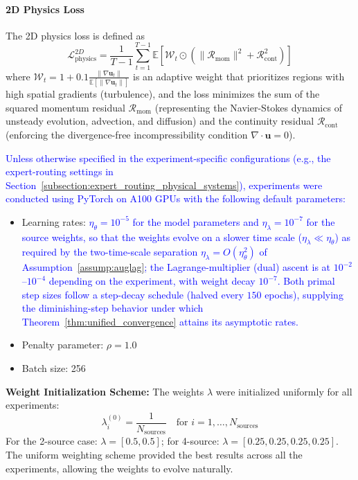 \documentclass[preprint,12pt,authoryear]{elsarticle}
\begin{document}
\paragraph{2D Physics Loss}

\noindent The 2D physics loss is defined as
\[
\mathcal{L}_{\text{physics}}^{2D} = \frac{1}{T-1}\sum_{t=1}^{T-1} \mathbb{E}\left[ \mathcal{W}_t \odot \left( \|\mathcal{R}_{\text{mom}}\|^2 + \mathcal{R}_{\text{cont}}^2 \right) \right]
\]
where $\mathcal{W}_t = 1 + 0.1 \frac{\| \nabla \mathbf{u}_t \|}{\mathbb{E}[\| \nabla \mathbf{u}_t \|]}$ is an adaptive weight that prioritizes regions with high spatial gradients (turbulence), and the loss minimizes the sum of the squared momentum residual $\mathcal{R}_{\text{mom}}$ (representing the Navier-Stokes dynamics of unsteady evolution, advection, and diffusion) and the continuity residual $\mathcal{R}_{\text{cont}}$ (enforcing the divergence-free incompressibility condition $\nabla \cdot \mathbf{u} = 0$).


\textcolor{blue}{Unless otherwise specified in the experiment-specific configurations (e.g., the expert-routing settings in Section~\ref{subsection:expert_routing_physical_systems}), experiments were conducted using PyTorch on A100 GPUs with the following default parameters:}
\begin{itemize}
    \item Learning rates: \textcolor{blue}{$\eta_\theta = 10^{-5}$ for the model parameters and $\eta_\lambda = 10^{-7}$ for the source weights, so that the weights evolve on a slower time scale ($\eta_\lambda \ll \eta_\theta$) as required by the two-time-scale separation $\eta_\lambda = O(\eta_\theta^2)$ of Assumption~\ref{assump:auglag}; the Lagrange-multiplier (dual) ascent is at $10^{-2}$--$10^{-4}$ depending on the experiment, with weight decay $10^{-7}$. Both primal step sizes follow a step-decay schedule (halved every $150$ epochs), supplying the diminishing-step behavior under which Theorem~\ref{thm:unified_convergence} attains its asymptotic rates.}
    \item Penalty parameter: $\rho = 1.0$
    \item Batch size: 256
\end{itemize}


\textbf{Weight Initialization Scheme:}
The weights $\lambda$ were initialized uniformly for all experiments:
\begin{equation}
\lambda^{(0)}_i = \frac{1}{N_{\text{sources}}} \quad \text{for } i=1,\dots,N_{\text{sources}}
\end{equation}
For the 2-source case: $\lambda = [0.5, 0.5]$; for 4-source: $\lambda = [0.25, 0.25, 0.25, 0.25]$. The uniform weighting scheme provided the best results across all the experiments, allowing the weights to evolve naturally.
\end{document}
